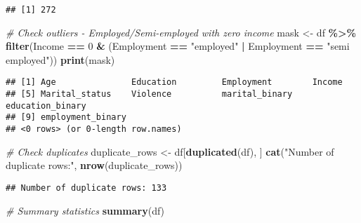 \documentclass[
]{article}
\newenvironment{Shaded}{\begin{snugshade}}{\end{snugshade}}
\newcommand{\CommentTok}[1]{\textcolor[rgb]{0.56,0.35,0.01}{\textit{#1}}}
\newcommand{\DecValTok}[1]{\textcolor[rgb]{0.00,0.00,0.81}{#1}}
\newcommand{\FunctionTok}[1]{\textcolor[rgb]{0.13,0.29,0.53}{\textbf{#1}}}
\newcommand{\NormalTok}[1]{#1}
\newcommand{\OtherTok}[1]{\textcolor[rgb]{0.56,0.35,0.01}{#1}}
\newcommand{\SpecialCharTok}[1]{\textcolor[rgb]{0.81,0.36,0.00}{\textbf{#1}}}
\newcommand{\StringTok}[1]{\textcolor[rgb]{0.31,0.60,0.02}{#1}}
\begin{document}
\begin{verbatim}
## [1] 272
\end{verbatim}

\begin{Shaded}
\begin{Highlighting}[]
\CommentTok{\# Check outliers {-} Employed/Semi{-}employed with zero income}
\NormalTok{mask }\OtherTok{\textless{}{-}}\NormalTok{ df }\SpecialCharTok{\%\textgreater{}\%}
  \FunctionTok{filter}\NormalTok{(Income }\SpecialCharTok{==} \DecValTok{0} \SpecialCharTok{\&}\NormalTok{ (Employment }\SpecialCharTok{==} \StringTok{"employed"} \SpecialCharTok{|}\NormalTok{ Employment }\SpecialCharTok{==} \StringTok{"semi employed"}\NormalTok{))}
\FunctionTok{print}\NormalTok{(mask)}
\end{Highlighting}
\end{Shaded}

\begin{verbatim}
## [1] Age               Education         Employment        Income           
## [5] Marital_status    Violence          marital_binary    education_binary 
## [9] employment_binary
## <0 rows> (or 0-length row.names)
\end{verbatim}

\begin{Shaded}
\begin{Highlighting}[]
\CommentTok{\# Check duplicates}
\NormalTok{duplicate\_rows }\OtherTok{\textless{}{-}}\NormalTok{ df[}\FunctionTok{duplicated}\NormalTok{(df), ]}
\FunctionTok{cat}\NormalTok{(}\StringTok{"Number of duplicate rows:"}\NormalTok{, }\FunctionTok{nrow}\NormalTok{(duplicate\_rows))}
\end{Highlighting}
\end{Shaded}

\begin{verbatim}
## Number of duplicate rows: 133
\end{verbatim}

\begin{Shaded}
\begin{Highlighting}[]
\CommentTok{\# Summary statistics}
\FunctionTok{summary}\NormalTok{(df)}
\end{Highlighting}
\end{Shaded}
\end{document}
